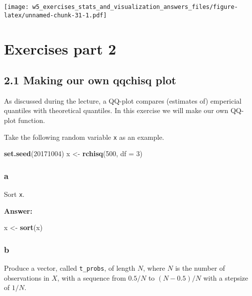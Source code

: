 \documentclass[]{article}
\newenvironment{Shaded}{\begin{snugshade}}{\end{snugshade}}
\newcommand{\DataTypeTok}[1]{\textcolor[rgb]{0.13,0.29,0.53}{#1}}
\newcommand{\DecValTok}[1]{\textcolor[rgb]{0.00,0.00,0.81}{#1}}
\newcommand{\KeywordTok}[1]{\textcolor[rgb]{0.13,0.29,0.53}{\textbf{#1}}}
\newcommand{\NormalTok}[1]{#1}
\newcommand{\StringTok}[1]{\textcolor[rgb]{0.31,0.60,0.02}{#1}}
\begin{document}
\texttt{[image: w5\_exercises\_stats\_and\_visualization\_answers\_files/figure-latex/unnamed-chunk-31-1.pdf]}

\newpage

\hypertarget{exercises-part-2}{%
\section{Exercises part 2}\label{exercises-part-2}}

\hypertarget{making-our-own-qqchisq-plot}{%
\subsection{2.1 Making our own qqchisq
plot}\label{making-our-own-qqchisq-plot}}

As discussed during the lecture, a QQ-plot compares (estimates of)
empericial quantiles with theoretical quantiles. In this exercise we
will make our own QQ-plot function.

Take the following random variable \texttt{x} as an example.

\begin{Shaded}
\begin{Highlighting}[]
\KeywordTok{set.seed}\NormalTok{(}\DecValTok{20171004}\NormalTok{)}
\NormalTok{x <-}\StringTok{ }\KeywordTok{rchisq}\NormalTok{(}\DecValTok{500}\NormalTok{, }\DataTypeTok{df =} \DecValTok{3}\NormalTok{)}
\end{Highlighting}
\end{Shaded}

\hypertarget{a-5}{%
\subsubsection{a}\label{a-5}}

Sort \texttt{x}.

\textbf{Answer:}

\begin{Shaded}
\begin{Highlighting}[]
\NormalTok{x <-}\StringTok{ }\KeywordTok{sort}\NormalTok{(x)}
\end{Highlighting}
\end{Shaded}

\hypertarget{b-5}{%
\subsubsection{b}\label{b-5}}

Produce a vector, called \texttt{t\_probs}, of length \(N\), where \(N\)
is the number of observations in \(X\), with a sequence from \(0.5/N\)
to \((N-0.5)/N\) with a stepsize of \(1/N\).
\end{document}
